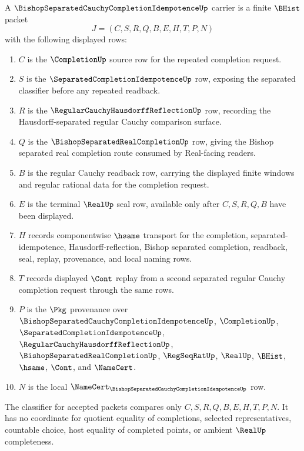 \begin{definition}
\label{def:bishop-separated-cauchy-completion-idempotence-carrier}
A $\BishopSeparatedCauchyCompletionIdempotenceUp$ carrier is a finite $\BHist$ packet
$$
J=(C,S,R,Q,B,E,H,T,P,N)
$$
with the following displayed rows:
\begin{enumerate}
\item $C$ is the $\CompletionUp$ source row for the repeated completion request.
\item $S$ is the $\SeparatedCompletionIdempotenceUp$ row, exposing the separated classifier before any repeated readback.
\item $R$ is the $\RegularCauchyHausdorffReflectionUp$ row, recording the Hausdorff-separated regular Cauchy comparison surface.
\item $Q$ is the $\BishopSeparatedRealCompletionUp$ row, giving the Bishop separated real completion route consumed by Real-facing readers.
\item $B$ is the regular Cauchy readback row, carrying the displayed finite windows and regular rational data for the completion request.
\item $E$ is the terminal $\RealUp$ seal row, available only after $C,S,R,Q,B$ have been displayed.
\item $H$ records componentwise $\hsame$ transport for the completion, separated-idempotence, Hausdorff-reflection, Bishop separated completion, readback, seal, replay, provenance, and local naming rows.
\item $T$ records displayed $\Cont$ replay from a second separated regular Cauchy completion request through the same rows.
\item $P$ is the $\Pkg$ provenance over $\BishopSeparatedCauchyCompletionIdempotenceUp$, $\CompletionUp$, $\SeparatedCompletionIdempotenceUp$, $\RegularCauchyHausdorffReflectionUp$, $\BishopSeparatedRealCompletionUp$, $\RegSeqRatUp$, $\RealUp$, $\BHist$, $\hsame$, $\Cont$, and $\NameCert$.
\item $N$ is the local $\NameCert_{\BishopSeparatedCauchyCompletionIdempotenceUp}$ row.
\end{enumerate}
The classifier for accepted packets compares only $C,S,R,Q,B,E,H,T,P,N$. It has no coordinate for quotient equality of completions, selected representatives, countable choice, host equality of completed points, or ambient $\RealUp$ completeness.
\end{definition}

